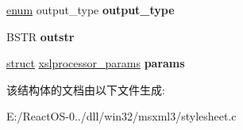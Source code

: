 \begin{DoxyCompactItemize}
\begin{tabbing}
\end{tabbing}\item 
\mbox{\label{structxslprocessor_a7e538661e0235b14de969e37aade5b75}} 
\hyperlink{interfaceenum}{enum} output\+\_\+type {\bfseries output\+\_\+type}
\item 
\mbox{\label{structxslprocessor_a99732e8fb1ea71887d90392d82ff3d23}} 
B\+S\+TR {\bfseries outstr}
\item 
\mbox{\label{structxslprocessor_a45a0e070e04c85168029cc65f776f044}} 
\hyperlink{interfacestruct}{struct} \hyperlink{structxslprocessor__params}{xslprocessor\+\_\+params} {\bfseries params}
\end{DoxyCompactItemize}


该结构体的文档由以下文件生成\+:\begin{DoxyCompactItemize}
\item 
E\+:/\+React\+O\+S-\/0../dll/win32/msxml3/stylesheet.\+c\end{DoxyCompactItemize}
